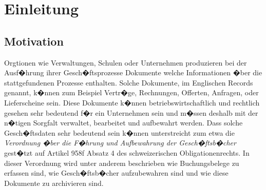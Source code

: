 \documentclass[a4paper,twoside,10pt]{report}
\begin{document}

\pagestyle{empty} %









\cleardoublepage
\tableofcontents %
\cleardoublepage %

\pagestyle{plain} %





\chapter{Einleitung}\label{sec:motivation}

\section{Motivation}
Orgtionen wie Verwaltungen, Schulen oder Unternehmen produzieren bei der Ausf�hrung ihrer Gesch�ftsprozesse Dokumente welche Informationen �ber die stattgefundenen Prozesse enthalten. 
Solche Dokumente, im Englischen Records genannt, k�nnen zum Beispiel Vertr�ge, Rechnungen, Offerten, Anfragen, oder Lieferscheine sein. Diese Dokumente k�nnen betriebswirtschaftlich und rechtlich gesehen sehr bedeutend f�r ein Unternehmen sein und m�ssen deshalb mit der n�tigen Sorgfalt verwaltet, bearbeitet und aufbewahrt werden. Dass solche Gesch�ftsdaten sehr bedeutend sein k�nnen unterstreicht zum etwa die \emph{Verordnung �ber die F�hrung und 
Aufbewahrung der Gesch�ftsb�cher} gest�tzt auf Artikel 958f Absatz 4 des schweizerischen Obligationenrechts. In dieser Verordnung wird unter anderem beschrieben wie Buchungsbelege zu erfassen sind, wie Gesch�ftsb�cher aufzubewahren sind und wie diese Dokumente zu archivieren sind.
\end{document}
